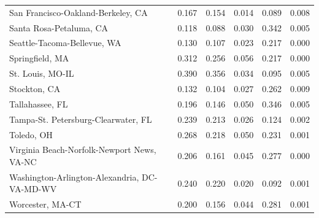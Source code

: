 \begin{longtable}{lrrrrr}
          San Francisco-Oakland-Berkeley, CA &              0.167 &              0.154 &                 0.014 &           0.089 &       0.008 \\
                     Santa Rosa-Petaluma, CA &              0.118 &              0.088 &                 0.030 &           0.342 &       0.005 \\
                 Seattle-Tacoma-Bellevue, WA &              0.130 &              0.107 &                 0.023 &           0.217 &       0.000 \\
                             Springfield, MA &              0.312 &              0.256 &                 0.056 &           0.217 &       0.000 \\
                            St. Louis, MO-IL &              0.390 &              0.356 &                 0.034 &           0.095 &       0.005 \\
                                Stockton, CA &              0.132 &              0.104 &                 0.027 &           0.262 &       0.009 \\
                             Tallahassee, FL &              0.196 &              0.146 &                 0.050 &           0.346 &       0.005 \\
         Tampa-St. Petersburg-Clearwater, FL &              0.239 &              0.213 &                 0.026 &           0.124 &       0.002 \\
                                  Toledo, OH &              0.268 &              0.218 &                 0.050 &           0.231 &       0.001 \\
  Virginia Beach-Norfolk-Newport News, VA-NC &              0.206 &              0.161 &                 0.045 &           0.277 &       0.000 \\
Washington-Arlington-Alexandria, DC-VA-MD-WV &              0.240 &              0.220 &                 0.020 &           0.092 &       0.001 \\
                            Worcester, MA-CT &              0.200 &              0.156 &                 0.044 &           0.281 &       0.001 \\
\end{longtable}


